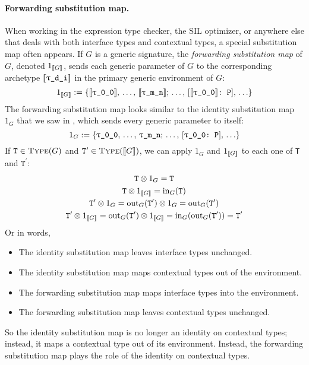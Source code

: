 \documentclass[../generics]{subfiles}
\begin{document}
\paragraph{Forwarding substitution map.} When working in the expression type checker, the SIL optimizer, or anywhere else that deals with both interface types and contextual types, a special substitution map often appears. If $G$ is a generic signature, the \emph{forwarding substitution map} of $G$, denoted $1_{[\![G]\!]}$, sends each generic parameter  of $G$ to the corresponding archetype $[\![\texttt{\texttt{$\uptau$\_d\_i}}]\!]$ in the primary generic environment of $G$:
\[1_{\EquivClass{G}}:=\{\archetype{\ttgp{0}{0}},\,\ldots,\,\archetype{\ttgp{m}{n}};\,\ldots,\,\ConfReq{$\archetype{\ttgp{0}{0}}$}{P},\,\ldots\}\]
The forwarding substitution map looks similar to the identity substitution map $1_G$ that we saw in , which sends every generic parameter to itself:
\[1_{G}:=\{\texttt{$\uptau$\_0\_0},\,\ldots,\,\texttt{$\uptau$\_m\_n};\,\ldots,\,[\texttt{\texttt{$\uptau$\_0\_0}:~P}],\,\ldots\}\]
If $\texttt{T}\in\textsc{Type}({G})$ and $\texttt{T}^\prime\in\textsc{Type}({[\![G]\!]})$, we can apply $1_G$ and $1_{[\![G]\!]}$ to each one of \texttt{T} and $\texttt{T}^\prime$:
\begin{gather*}
\texttt{T}\otimes 1_G=\texttt{T}\\
\texttt{T}\otimes 1_{[\![G]\!]}=\mathrm{in}_G(\texttt{T})\\
\texttt{T}^\prime\otimes 1_G=\mathrm{out}_G(\texttt{T}^\prime)\otimes 1_G=\mathrm{out}_G(\texttt{T}^\prime)\\
\texttt{T}^\prime\otimes 1_{[\![G]\!]}=\mathrm{out}_G(\texttt{T}^\prime)\otimes 1_{[\![G]\!]}=\mathrm{in}_G(\mathrm{out}_G(\texttt{T}^\prime))=\texttt{T}^\prime
\end{gather*}
Or in words,
\begin{itemize}
\item The identity substitution map leaves interface types unchanged.
\item The identity substitution map maps contextual types out of the environment.
\item The forwarding substitution map maps interface types into the environment.
\item The forwarding substitution map leaves contextual types unchanged.
\end{itemize}
So the identity substitution map is no longer an identity on contextual types; instead, it maps a contextual type out of its environment. Instead, the forwarding substitution map plays the role of the identity on contextual types.
\end{document}
